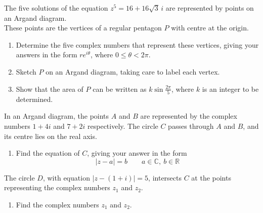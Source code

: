 \documentclass[leqno]{article}
\begin{document}
\begin{enumerate}[
  label=\textbf{\arabic*.},
  leftmargin=*,
  topsep=0pt,
  partopsep=0pt,
  parsep=0pt
]
The five solutions of the equation $z^5=16+16\sqrt{3}\,i$ are represented by points on an Argand diagram. \\

These points are the vertices of a regular pentagon $P$ with centre at the origin. \\

\begin{enumerate}[label=\textbf{(\alph*)}]
    \item Determine the five complex numbers that represent these vertices, giving your answers in the form $re^{i\theta}$, where $0\leq \theta<2\pi$.  \\

    \item Sketch $P$ on an Argand diagram, taking care to label each vertex. \\

    \item Show that the area of $P$ can be written as $k\sin\frac{2\pi}{5}$, where $k$ is an integer to be determined. 
    
\end{enumerate}


\newpage

\questionitem

In an Argand diagram, the points $A$ and $B$ are represented by the complex numbers $1+4i$ and $7+2i$ respectively. The circle $C$ passes through $A$ and $B$, and its centre lies on the real axis. \\
\begin{enumerate}[label=\textbf{(\alph*)}]
  \item Find the equation of $C$, giving your answer in the form
  \[
  |z-a|=b \qquad a\in\mathbb{C},\ b\in\mathbb{R}
  \]
\end{enumerate}
The circle $D$, with equation $|z-(1+i)|=5$, intersects $C$ at the points representing the complex numbers $z_1$ and $z_2$. \\
\begin{enumerate}[label=\textbf{(\alph*)}, resume]
  \item Find the complex numbers $z_1$ and $z_2$.  \\
\end{enumerate}

\newpage


\newpage
\questionitem


\end{enumerate}
\end{document}
